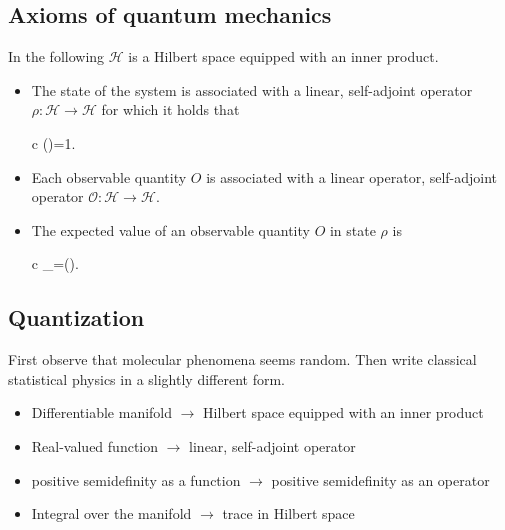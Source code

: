 \documentclass[11pt,oneside,%
]{memoir}
\newenvironment{eqna}{\begin{IEEEeqnarray}{c}}{\end{IEEEeqnarray}\ignorespacesafterend}
\DeclareMathOperator{\Tr}{Tr}
\begin{document}
\subsection{Axioms of quantum mechanics}

In the following \(\mathcal{H}\) is a Hilbert space equipped with an inner product.

\begin{itemize}
    \item The state of the system is associated with a linear, self-adjoint operator \(\rho:\mathcal{H}\rightarrow\mathcal{H}\) for which it holds that
    \begin{eqna}
        \braket{\psi|\rho|\psi}\qquad{}\qquad\Tr(\rho)=1.\nonumber
    \end{eqna}
    \item Each observable quantity \(O\) is associated with a linear operator, self-adjoint operator \(\mathcal{O}:\mathcal{H}\rightarrow\mathcal{H}\).
    \item The expected value of an observable quantity \(O\) in state \(\rho\) is
    \begin{eqna}
        \langle{}\rangle_\rho=\Tr(\rho{}).\nonumber
    \end{eqna}
\end{itemize}

\subsection{Quantization}

First observe that molecular phenomena seems random. Then write classical statistical physics in a slightly different form.

\begin{itemize}
    \item Differentiable manifold \(\rightarrow\) Hilbert space equipped with an inner product
    \item Real-valued function \(\rightarrow\) linear, self-adjoint operator
    \item positive semidefinity as a function \(\rightarrow\) positive semidefinity as an operator
    \item Integral over the manifold \(\rightarrow\) trace in Hilbert space
\end{itemize}
\end{document}
